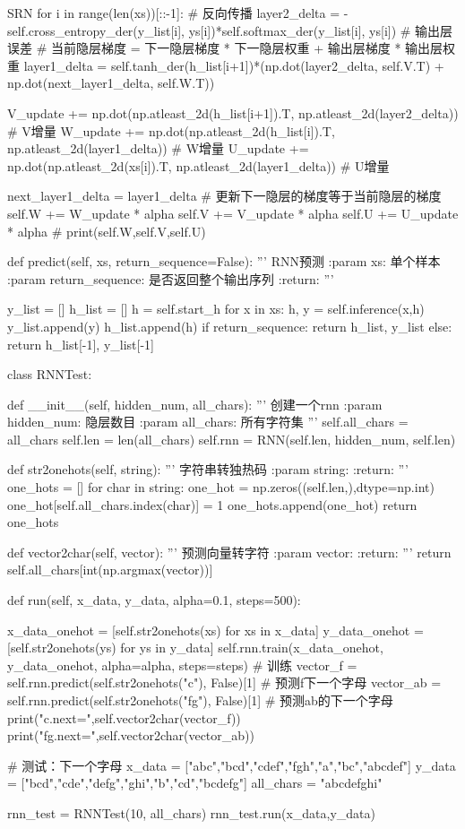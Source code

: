 \documentclass[openbib]{article}
\begin{document}
\begin{Python}{SRN}
	for i in range(len(xs))[::-1]:  # 反向传播
	layer2_delta = -self.cross_entropy_der(y_list[i], ys[i])*self.softmax_der(y_list[i], ys[i])  # 输出层误差
	# 当前隐层梯度 = 下一隐层梯度 * 下一隐层权重 + 输出层梯度 * 输出层权重
	layer1_delta = self.tanh_der(h_list[i+1])*(np.dot(layer2_delta, self.V.T) + np.dot(next_layer1_delta, self.W.T))
	
	V_update += np.dot(np.atleast_2d(h_list[i+1]).T, np.atleast_2d(layer2_delta))  # V增量
	W_update += np.dot(np.atleast_2d(h_list[i]).T,  np.atleast_2d(layer1_delta))  # W增量
	U_update += np.dot(np.atleast_2d(xs[i]).T,  np.atleast_2d(layer1_delta))  # U增量
	
	next_layer1_delta = layer1_delta  # 更新下一隐层的梯度等于当前隐层的梯度
	self.W += W_update * alpha
	self.V += V_update * alpha
	self.U += U_update * alpha
	# print(self.W,self.V,self.U)
	
	def predict(self, xs, return_sequence=False):
	'''
	RNN预测
	:param xs: 单个样本
	:param return_sequence: 是否返回整个输出序列
	:return:
	'''
	
	y_list = []
	h_list = []
	h = self.start_h
	for x in xs:
	h, y = self.inference(x,h)
	y_list.append(y)
	h_list.append(h)
	if return_sequence:
	return h_list, y_list
	else:
	return h_list[-1], y_list[-1]
	
	class RNNTest:
	
	def __init__(self, hidden_num, all_chars):
	'''
	创建一个rnn
	:param hidden_num: 隐层数目
	:param all_chars: 所有字符集
	'''
	self.all_chars = all_chars
	self.len = len(all_chars)
	self.rnn = RNN(self.len, hidden_num, self.len)
	
	def str2onehots(self, string):
	'''
	字符串转独热码
	:param string:
	:return:
	'''
	one_hots = []
	for char in string:
	one_hot = np.zeros((self.len,),dtype=np.int)
	one_hot[self.all_chars.index(char)] = 1
	one_hots.append(one_hot)
	return one_hots
	
	def vector2char(self, vector):
	'''
	预测向量转字符
	:param vector:
	:return:
	'''
	return self.all_chars[int(np.argmax(vector))]
	
	def run(self, x_data, y_data, alpha=0.1, steps=500):
	
	x_data_onehot = [self.str2onehots(xs) for xs in x_data]
	y_data_onehot = [self.str2onehots(ys) for ys in y_data]
	self.rnn.train(x_data_onehot, y_data_onehot, alpha=alpha, steps=steps) # 训练
	vector_f = self.rnn.predict(self.str2onehots("c"), False)[1] # 预测f下一个字母
	vector_ab = self.rnn.predict(self.str2onehots("fg"), False)[1] # 预测ab的下一个字母
	print("c.next=",self.vector2char(vector_f))
	print("fg.next=",self.vector2char(vector_ab))
	
	
	# 测试：下一个字母
	x_data = ["abc","bcd","cdef","fgh","a","bc","abcdef"]
	y_data = ["bcd","cde","defg","ghi","b","cd","bcdefg"]
	all_chars = "abcdefghi"
	
	rnn_test = RNNTest(10, all_chars)
	rnn_test.run(x_data,y_data)
	
\end{Python}
\end{document}
